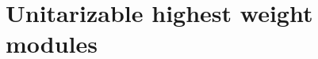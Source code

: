 \documentclass[12pt,a4paper,final]{report}
\begin{document}
%
%
%

\chapter{Unitarizable highest weight modules}\label{ch:unitarizable}
\end{document}
